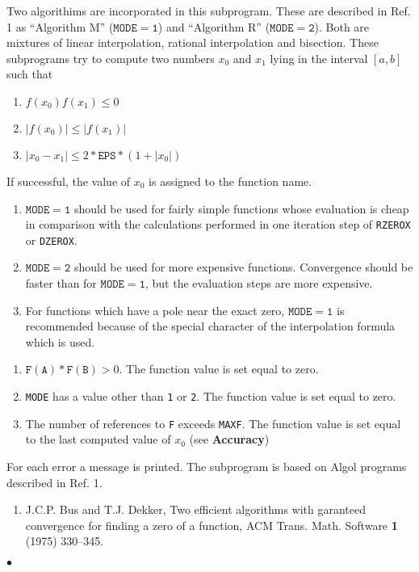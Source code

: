 \Method
Two algorithims are   incorporated in this subprogram. These are
described in Ref. 1 as ``Algorithm  M'' ($\mathtt{MODE=1}$) and
``Algorithm R'' ($\mathtt{MODE=2}$). Both  are mixtures  of linear
interpolation, rational interpolation and bisection.
\Accuracy
These subprograms try to compute two numbers $ x_0 $ and $ x_1$
lying in  the interval $[a,b]$ such that
\begin{enumerate}
\item $ f(x_0)f(x_1)\le 0 $
\item $ |f(x_0)| \le |f(x_1)|$
\item $ |x_0- x_1|\le 2*\mathtt{EPS}*  (1+|x_0|) $
\end{enumerate}
If successful, the value of $x_0 $ is assigned to the function name.
\newpage
\Notes
\begin{enumerate}
\item $\mathtt{MODE=1}$ should  be used for fairly simple functions whose
evaluation is cheap  in comparison with the calculations performed in
one iteration step of {\tt RZEROX}  or {\tt DZEROX}.
\item $\mathtt{MODE=2}$  should be used for more expensive functions.
Convergence should be faster than for $\mathtt{MODE=1}$, but the
evaluation steps are more expensive.
\item For functions which have a pole near the exact zero,
$\mathtt{MODE=1}$ is recommended because of the special character of
the interpolation formula which is used.
\end{enumerate}
\Errorh
\begin{enumerate}
\item $\mathtt{F(A)* F(B)} > 0$.
The function value is set equal to zero.
\item {\tt MODE} has a value other than {\tt 1} or {\tt 2}.
The function value is set equal to zero.
\item The number of references to {\tt F} exceeds {\tt MAXF}.
The function value is set equal to the last computed  value of $x_0$
(see {\bf Accuracy})
\end{enumerate}
For each error a message is printed.
\Source
The subprogram is based on Algol programs described  in Ref. 1.
\Refer
\begin{enumerate}
\item J.C.P. Bus and T.J. Dekker, Two efficient algorithms with
garanteed convergence for finding a zero of a function,
ACM Trans.  Math. Software {\bf 1} (1975) 330--345.
\end{enumerate}
$\bullet$
